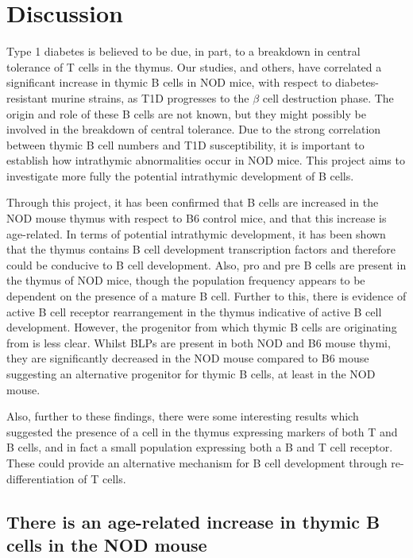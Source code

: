 
\chapter{Discussion}

Type 1 diabetes is believed to be due, in part, to a breakdown in central tolerance of T cells in the thymus.
Our studies, and others, have correlated a significant increase in thymic B cells in NOD mice, with respect to diabetes-resistant murine strains, as T1D progresses to the $\beta$ cell destruction phase.
The origin and role of these B cells are not known, but they might possibly be involved in the breakdown of central tolerance.
Due to the strong correlation between thymic B cell numbers and T1D susceptibility, it is important to establish how intrathymic abnormalities occur in NOD mice.
This project aims to investigate more fully the potential intrathymic development of B cells.

Through this project, it has been confirmed that B cells are increased in the NOD mouse thymus with respect to B6 control mice, and that this increase is age-related.
In terms of potential intrathymic development, it has been shown that the thymus contains B cell development transcription factors and therefore could be conducive to B cell development.
Also, pro and pre B cells are present in the thymus of NOD mice, though the population frequency appears to be dependent on the presence of a mature B cell.
Further to this, there is evidence of active B cell receptor rearrangement in the thymus indicative of active B cell development.
However, the progenitor from which thymic B cells are originating from is less clear. 
Whilst BLPs are present in both NOD and B6 mouse thymi, they are significantly decreased in the NOD mouse compared to B6 mouse suggesting an alternative progenitor for thymic B cells, at least in the NOD mouse.

Also, further to these findings, there were some interesting results which suggested the presence of a cell in the thymus expressing markers of both T and B cells, and in fact a small population expressing both a B and T cell receptor.
These could provide an alternative mechanism for B cell development through re-differentiation of T cells.


\section{There is an age-related increase in thymic B cells in the NOD mouse}

